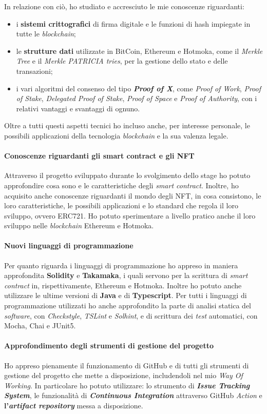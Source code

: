 \noindent In relazione con ciò, ho studiato e accresciuto le mie conoscenze riguardanti: 
\begin{itemize}
  \item i \textbf{sistemi crittografici} di firma digitale e le funzioni di hash impiegate in tutte le \textit{blockchain};
  \item le \textbf{strutture dati} utilizzate in BitCoin, Ethereum e Hotmoka, come il \textit{Merkle Tree} e il \textit{Merkle PATRICIA tries}, per la gestione dello stato e delle transazioni;
  \item i vari algoritmi del consenso del tipo \textbf{\textit{Proof of X}}, come \textit{Proof of Work}, \textit{Proof of Stake}, \textit{Delegated Proof of Stake}, \textit{Proof of Space} e \textit{Proof of Authority}, con i relativi vantaggi e svantaggi di ognuno.
\end{itemize}

Oltre a tutti questi aspetti tecnici ho incluso anche, per interesse personale, le possibili applicazioni della tecnologia \textit{blockchain} e la sua valenza legale.

\paragraph{Conoscenze riguardanti gli smart contract e gli NFT}
Attraverso il progetto sviluppato durante lo svolgimento dello stage ho potuto approfondire cosa sono e le caratteristiche degli \textit{smart contract}. Inoltre, ho acquisito anche conoscenze riguardanti il mondo degli NFT, in cosa consistono, le loro caratteristiche, le possibili applicazioni e lo standard che regola il loro sviluppo, ovvero ERC721. Ho potuto sperimentare a livello pratico anche il loro sviluppo nelle \textit{blockchain} Ethereum e Hotmoka.

\paragraph{Nuovi linguaggi di programmazione}
Per quanto riguarda i linguaggi di programmazione ho appreso in maniera approfondita \textbf{Solidity} e \textbf{Takamaka}, i quali servono per la scrittura di \textit{smart contract} in, rispettivamente, Ethereum e Hotmoka. Inoltre ho potuto anche utilizzare le ultime versioni di \textbf{Java} e di \textbf{Typescript}.
Per tutti i linguaggi di programmazione utilizzati ho anche approfondito la parte di analisi statica del \textit{software}, con \textit{Checkstyle}, \textit{TSLint} e \textit{Solhint}, e di scrittura dei \textit{test} automatici, con Mocha, Chai e JUnit5.

\paragraph{Approfondimento degli strumenti di gestione del progetto}
Ho appreso pienamente il funzionamento di GitHub e di tutti gli strumenti di gestione del progetto che mette a disposizione, includendoli nel mio \textit{Way Of Working}. In particolare ho potuto utilizzare: lo strumento di \textbf{\textit{Issue Tracking System}}, le funzionalità di \textbf{\textit{Continuous Integration}} attraverso GitHub \textit{Action} e \textbf{l'\textit{artifact repository}} messa a disposizione.
